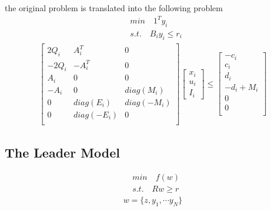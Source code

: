 \documentclass[11pt]{article} %
\begin{document}
the original problem is translated into the following problem
\begin{align}  
    &min \quad 1^T y_i \nonumber\\
    &s.t. \quad B_i y_i \leq r_i
\end{align}
\begin{align}  
    \begin{bmatrix}
         2 Q_i & A_i^T & 0\\
         -2 Q_i & -A_i^T & 0\\
         A_i & 0 & 0\\
         -A_i & 0 & diag(M_i)\\
         0 & diag(E_i) & diag(-M_i)\\
         0 & diag(-E_i) & 0\\
    \end{bmatrix}
    \begin{bmatrix}
        x_i \\
        u_i \\
        I_i 
    \end{bmatrix} \leq
    \begin{bmatrix}
        -c_{i}\\
        c_{i}\\
        d_i\\
        -d_i + M_i\\
        0\\
        0\\
    \end{bmatrix} 
\end{align}




\subsection{The Leader Model}
\begin{align}  
    &min \quad f(w)\nonumber\\
    &s.t. \quad Rw \geq r
\end{align}
\begin{align}  
    w = \{z, y_{1}, \cdots y_{N}\}
\end{align}
\end{document}
